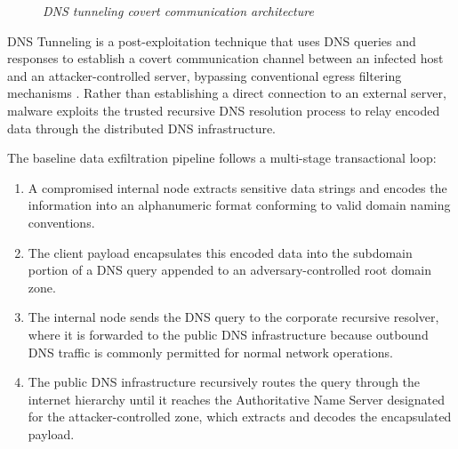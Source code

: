 \documentclass[14pt, a4paper, oneside]{report}
\begin{document}
\begin{figure}[H]
\caption{\textit{DNS tunneling covert communication architecture}}
\label{fig:dns_tunneling_architecture}
\end{figure}
DNS Tunneling is a post-exploitation technique that uses DNS queries and responses to establish a covert communication channel between an infected host and an attacker-controlled server, bypassing conventional egress filtering mechanisms \cite{isik2025}. Rather than establishing a direct connection to an external server, malware exploits the trusted recursive DNS resolution process to relay encoded data through the distributed DNS infrastructure.

The baseline data exfiltration pipeline follows a multi-stage transactional loop:
\begin{enumerate}
    \item A compromised internal node extracts sensitive data strings and encodes the information into an alphanumeric format conforming to valid domain naming conventions.
    \item The client payload encapsulates this encoded data into the subdomain portion of a DNS query appended to an adversary-controlled root domain zone.
    \item The internal node sends the DNS query to the corporate recursive resolver, where it is forwarded to the public DNS infrastructure because outbound DNS traffic is commonly permitted for normal network operations.
    \item The public DNS infrastructure recursively routes the query through the internet hierarchy until it reaches the Authoritative Name Server designated for the attacker-controlled zone, which extracts and decodes the encapsulated payload.
\end{enumerate}
\end{document}
